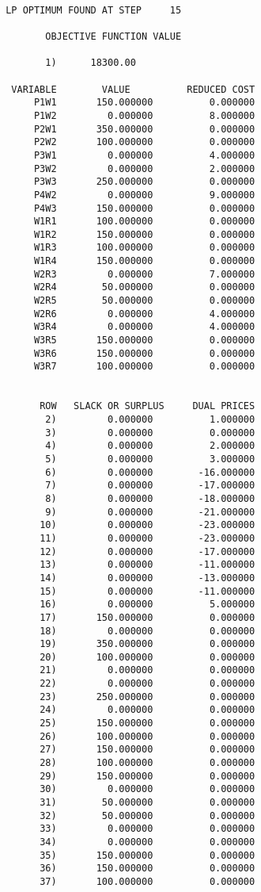 \begin{verbatim}
 
 LP OPTIMUM FOUND AT STEP     15

        OBJECTIVE FUNCTION VALUE

        1)      18300.00

  VARIABLE        VALUE          REDUCED COST
      P1W1       150.000000          0.000000
      P1W2         0.000000          8.000000
      P2W1       350.000000          0.000000
      P2W2       100.000000          0.000000
      P3W1         0.000000          4.000000
      P3W2         0.000000          2.000000
      P3W3       250.000000          0.000000
      P4W2         0.000000          9.000000
      P4W3       150.000000          0.000000
      W1R1       100.000000          0.000000
      W1R2       150.000000          0.000000
      W1R3       100.000000          0.000000
      W1R4       150.000000          0.000000
      W2R3         0.000000          7.000000
      W2R4        50.000000          0.000000
      W2R5        50.000000          0.000000
      W2R6         0.000000          4.000000
      W3R4         0.000000          4.000000
      W3R5       150.000000          0.000000
      W3R6       150.000000          0.000000
      W3R7       100.000000          0.000000


       ROW   SLACK OR SURPLUS     DUAL PRICES
        2)         0.000000          1.000000
        3)         0.000000          0.000000
        4)         0.000000          2.000000
        5)         0.000000          3.000000
        6)         0.000000        -16.000000
        7)         0.000000        -17.000000
        8)         0.000000        -18.000000
        9)         0.000000        -21.000000
       10)         0.000000        -23.000000
       11)         0.000000        -23.000000
       12)         0.000000        -17.000000
       13)         0.000000        -11.000000
       14)         0.000000        -13.000000
       15)         0.000000        -11.000000
       16)         0.000000          5.000000
       17)       150.000000          0.000000
       18)         0.000000          0.000000
       19)       350.000000          0.000000
       20)       100.000000          0.000000
       21)         0.000000          0.000000
       22)         0.000000          0.000000
       23)       250.000000          0.000000
       24)         0.000000          0.000000
       25)       150.000000          0.000000
       26)       100.000000          0.000000
       27)       150.000000          0.000000
       28)       100.000000          0.000000
       29)       150.000000          0.000000
       30)         0.000000          0.000000
       31)        50.000000          0.000000
       32)        50.000000          0.000000
       33)         0.000000          0.000000
       34)         0.000000          0.000000
       35)       150.000000          0.000000
       36)       150.000000          0.000000
       37)       100.000000          0.000000


\end{verbatim}
